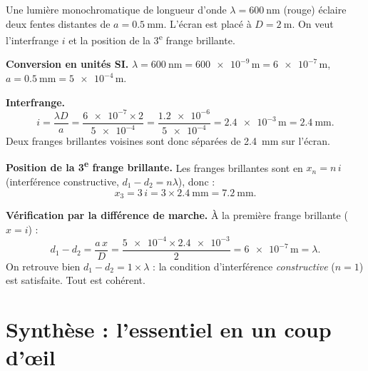\documentclass[11pt,a4paper]{article}
\begin{document}
\begin{exemple}
Une lumière monochromatique de longueur d'onde $\lambda = \SI{600}{\nano\metre}$ (rouge)
éclaire deux fentes distantes de $a = \SI{0.5}{\milli\metre}$. L'écran est placé à
$D = \SI{2}{\metre}$. On veut l'interfrange $i$ et la position de la 3\textsuperscript{e} frange
brillante.

\smallskip
\textbf{Conversion en unités SI.} \quad
$\lambda = \SI{600}{\nano\metre} = \num{600e-9}\,\si{\metre} = \num{6e-7}\,\si{\metre}$,\quad
$a = \SI{0.5}{\milli\metre} = \num{5e-4}\,\si{\metre}$.

\smallskip
\textbf{Interfrange.}
\[ i = \frac{\lambda D}{a}
   = \frac{\num{6e-7}\times 2}{\num{5e-4}}
   = \frac{\num{1.2e-6}}{\num{5e-4}}
   = \num{2.4e-3}\,\si{\metre} = \SI{2.4}{\milli\metre}. \]
Deux franges brillantes voisines sont donc séparées de \SI{2.4}{\milli\metre} sur l'écran.

\smallskip
\textbf{Position de la 3\textsuperscript{e} frange brillante.} Les franges brillantes sont en
$x_n = n\,i$ (interférence constructive, $d_1 - d_2 = n\lambda$), donc :
\[ x_3 = 3\,i = 3\times \SI{2.4}{\milli\metre} = \SI{7.2}{\milli\metre}. \]

\smallskip
\textbf{Vérification par la différence de marche.} À la première frange brillante ($x = i$) :
\[ d_1 - d_2 = \frac{a\,x}{D} = \frac{\num{5e-4}\times \num{2.4e-3}}{2}
   = \num{6e-7}\,\si{\metre} = \lambda. \]
On retrouve bien $d_1 - d_2 = 1\times\lambda$ : la condition d'interférence \emph{constructive}
($n=1$) est satisfaite. Tout est cohérent.
\end{exemple}

\section{Synthèse : l'essentiel en un coup d'œil}
\end{document}
